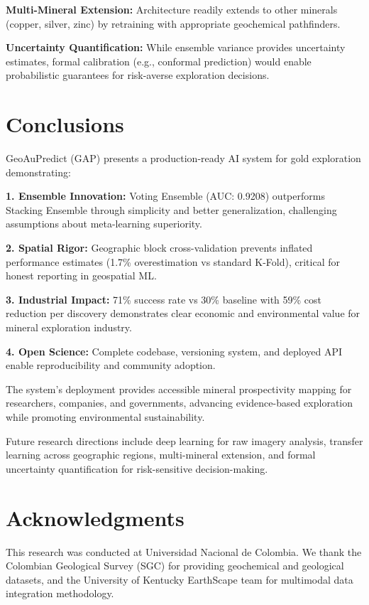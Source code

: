 \documentclass[12pt,a4paper]{article}
\begin{document}
\textbf{Multi-Mineral Extension:} Architecture readily extends to other minerals (copper, silver, zinc) by retraining with appropriate geochemical pathfinders.

\textbf{Uncertainty Quantification:} While ensemble variance provides uncertainty estimates, formal calibration (e.g., conformal prediction) would enable probabilistic guarantees for risk-averse exploration decisions.

\section{Conclusions}

GeoAuPredict (GAP) presents a production-ready AI system for gold exploration demonstrating:

\textbf{1. Ensemble Innovation:} Voting Ensemble (AUC: 0.9208) outperforms Stacking Ensemble through simplicity and better generalization, challenging assumptions about meta-learning superiority.

\textbf{2. Spatial Rigor:} Geographic block cross-validation prevents inflated performance estimates (1.7\% overestimation vs standard K-Fold), critical for honest reporting in geospatial ML.

\textbf{3. Industrial Impact:} 71\% success rate vs 30\% baseline with 59\% cost reduction per discovery demonstrates clear economic and environmental value for mineral exploration industry.

\textbf{4. Open Science:} Complete codebase, versioning system, and deployed API enable reproducibility and community adoption.

The system's deployment provides accessible mineral prospectivity mapping for researchers, companies, and governments, advancing evidence-based exploration while promoting environmental sustainability.

Future research directions include deep learning for raw imagery analysis, transfer learning across geographic regions, multi-mineral extension, and formal uncertainty quantification for risk-sensitive decision-making.

\section*{Acknowledgments}

This research was conducted at Universidad Nacional de Colombia. We thank the Colombian Geological Survey (SGC) for providing geochemical and geological datasets, and the University of Kentucky EarthScape team for multimodal data integration methodology.
\end{document}
